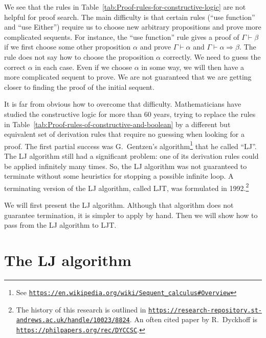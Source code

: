 We see that the rules in Table~\ref{tab:Proof-rules-for-constructive-logic}
are not helpful for proof search. The main difficulty is that certain
rules (\textsf{``}use function\textsf{''} and \textsf{``}use Either\textsf{''}) require us to choose
new arbitrary propositions and prove more complicated sequents. For
instance, the \textsf{``}use function\textsf{''} rule gives a proof of $\Gamma\vdash\beta$
if we first choose some other proposition $\alpha$ and prove $\Gamma\vdash\alpha$
and $\Gamma\vdash\alpha\Rightarrow\beta$. The rule does not say how
to choose the proposition $\alpha$ correctly. We need to guess the
correct $\alpha$ in each case. Even if we choose $\alpha$ in some
way, we will then have a more complicated sequent to prove. We are
not guaranteed that we are getting closer to finding the proof of
the initial sequent. 

It is far from obvious how to overcome that difficulty. Mathematicians
have studied the constructive logic for more than 60 years, trying
to replace the rules in Table~\ref{tab:Proof-rules-of-constructive-and-boolean}
by a different but equivalent set of derivation rules that require
no guessing when looking for a proof. The first partial success was
G.~Gentzen\textsf{'}s algorithm\footnote{See \texttt{\href{https://en.wikipedia.org/wiki/Sequent_calculus\#Overview}{https://en.wikipedia.org/wiki/Sequent\_calculus\#Overview}}}
that he called \textsf{``}LJ\textsf{''}. The LJ algorithm
still had a significant problem: one of its derivation rules could
be applied infinitely many times. So, the LJ algorithm was not guaranteed
to terminate without some heuristics for stopping a possible infinite
loop. A terminating version of the LJ algorithm, called LJT,
was formulated in 1992.\footnote{The history of this research is outlined in \texttt{\href{https://research-repository.st-andrews.ac.uk/handle/10023/8824}{https://research-repository.st-andrews.ac.uk/handle/10023/8824}}.
An often cited paper by R.~Dyckhoff is \texttt{\href{https://philpapers.org/rec/DYCCSC}{https://philpapers.org/rec/DYCCSC}}.} 

We will first present the LJ algorithm. Although that algorithm does
not guarantee termination, it is simpler to apply by hand. Then we
will show how to pass from the LJ algorithm to LJT.

\section{The LJ algorithm}

